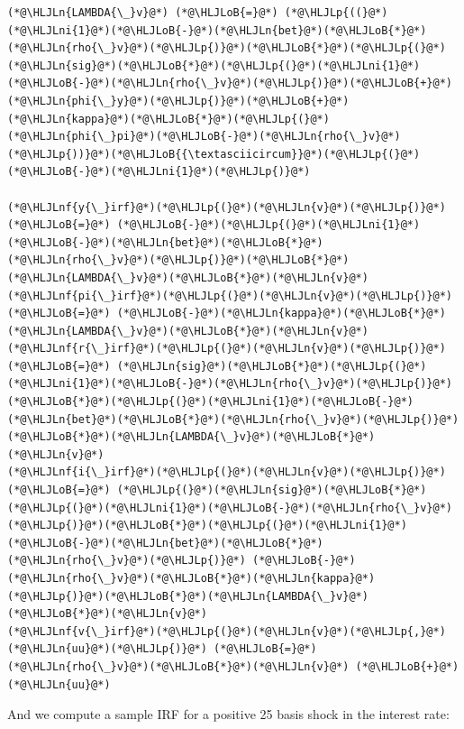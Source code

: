 \documentclass[12pt,a4paper]{article}
\newcommand{\HLJLn}[1]{#1}
\newcommand{\HLJLnf}[1]{\textcolor[RGB]{66,102,213}{#1}}
\newcommand{\HLJLni}[1]{\textcolor[RGB]{59,151,46}{#1}}
\newcommand{\HLJLoB}[1]{\textcolor[RGB]{102,102,102}{\textbf{#1}}}
\newcommand{\HLJLp}[1]{#1}
\begin{document}
\begin{lstlisting}
(*@\HLJLn{LAMBDA{\_}v}@*) (*@\HLJLoB{=}@*) (*@\HLJLp{((}@*)(*@\HLJLni{1}@*)(*@\HLJLoB{-}@*)(*@\HLJLn{bet}@*)(*@\HLJLoB{*}@*)(*@\HLJLn{rho{\_}v}@*)(*@\HLJLp{)}@*)(*@\HLJLoB{*}@*)(*@\HLJLp{(}@*)(*@\HLJLn{sig}@*)(*@\HLJLoB{*}@*)(*@\HLJLp{(}@*)(*@\HLJLni{1}@*)(*@\HLJLoB{-}@*)(*@\HLJLn{rho{\_}v}@*)(*@\HLJLp{)}@*)(*@\HLJLoB{+}@*)(*@\HLJLn{phi{\_}y}@*)(*@\HLJLp{)}@*)(*@\HLJLoB{+}@*)(*@\HLJLn{kappa}@*)(*@\HLJLoB{*}@*)(*@\HLJLp{(}@*)(*@\HLJLn{phi{\_}pi}@*)(*@\HLJLoB{-}@*)(*@\HLJLn{rho{\_}v}@*)(*@\HLJLp{))}@*)(*@\HLJLoB{{\textasciicircum}}@*)(*@\HLJLp{(}@*)(*@\HLJLoB{-}@*)(*@\HLJLni{1}@*)(*@\HLJLp{)}@*)

(*@\HLJLnf{y{\_}irf}@*)(*@\HLJLp{(}@*)(*@\HLJLn{v}@*)(*@\HLJLp{)}@*) (*@\HLJLoB{=}@*) (*@\HLJLoB{-}@*)(*@\HLJLp{(}@*)(*@\HLJLni{1}@*)(*@\HLJLoB{-}@*)(*@\HLJLn{bet}@*)(*@\HLJLoB{*}@*)(*@\HLJLn{rho{\_}v}@*)(*@\HLJLp{)}@*)(*@\HLJLoB{*}@*)(*@\HLJLn{LAMBDA{\_}v}@*)(*@\HLJLoB{*}@*)(*@\HLJLn{v}@*)
(*@\HLJLnf{pi{\_}irf}@*)(*@\HLJLp{(}@*)(*@\HLJLn{v}@*)(*@\HLJLp{)}@*) (*@\HLJLoB{=}@*) (*@\HLJLoB{-}@*)(*@\HLJLn{kappa}@*)(*@\HLJLoB{*}@*)(*@\HLJLn{LAMBDA{\_}v}@*)(*@\HLJLoB{*}@*)(*@\HLJLn{v}@*)
(*@\HLJLnf{r{\_}irf}@*)(*@\HLJLp{(}@*)(*@\HLJLn{v}@*)(*@\HLJLp{)}@*) (*@\HLJLoB{=}@*) (*@\HLJLn{sig}@*)(*@\HLJLoB{*}@*)(*@\HLJLp{(}@*)(*@\HLJLni{1}@*)(*@\HLJLoB{-}@*)(*@\HLJLn{rho{\_}v}@*)(*@\HLJLp{)}@*)(*@\HLJLoB{*}@*)(*@\HLJLp{(}@*)(*@\HLJLni{1}@*)(*@\HLJLoB{-}@*)(*@\HLJLn{bet}@*)(*@\HLJLoB{*}@*)(*@\HLJLn{rho{\_}v}@*)(*@\HLJLp{)}@*)(*@\HLJLoB{*}@*)(*@\HLJLn{LAMBDA{\_}v}@*)(*@\HLJLoB{*}@*)(*@\HLJLn{v}@*)
(*@\HLJLnf{i{\_}irf}@*)(*@\HLJLp{(}@*)(*@\HLJLn{v}@*)(*@\HLJLp{)}@*) (*@\HLJLoB{=}@*) (*@\HLJLp{(}@*)(*@\HLJLn{sig}@*)(*@\HLJLoB{*}@*)(*@\HLJLp{(}@*)(*@\HLJLni{1}@*)(*@\HLJLoB{-}@*)(*@\HLJLn{rho{\_}v}@*)(*@\HLJLp{)}@*)(*@\HLJLoB{*}@*)(*@\HLJLp{(}@*)(*@\HLJLni{1}@*)(*@\HLJLoB{-}@*)(*@\HLJLn{bet}@*)(*@\HLJLoB{*}@*)(*@\HLJLn{rho{\_}v}@*)(*@\HLJLp{)}@*) (*@\HLJLoB{-}@*) (*@\HLJLn{rho{\_}v}@*)(*@\HLJLoB{*}@*)(*@\HLJLn{kappa}@*)(*@\HLJLp{)}@*)(*@\HLJLoB{*}@*)(*@\HLJLn{LAMBDA{\_}v}@*)(*@\HLJLoB{*}@*)(*@\HLJLn{v}@*)
(*@\HLJLnf{v{\_}irf}@*)(*@\HLJLp{(}@*)(*@\HLJLn{v}@*)(*@\HLJLp{,}@*)(*@\HLJLn{uu}@*)(*@\HLJLp{)}@*) (*@\HLJLoB{=}@*) (*@\HLJLn{rho{\_}v}@*)(*@\HLJLoB{*}@*)(*@\HLJLn{v}@*) (*@\HLJLoB{+}@*) (*@\HLJLn{uu}@*)
\end{lstlisting}


And we compute a sample IRF for a positive 25 basis shock in the interest rate:
\end{document}
